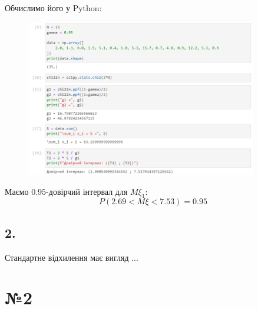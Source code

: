 \documentclass[11pt, a4paper]{article} %
\begin{document}
Обчислимо його у Python:
\begin{figure}[h]
    \centering
    \includegraphics[width=0.9\textwidth]{img/task1.png}
\end{figure}

\begin{mdframed}[style=ans]
    Маємо $0.95$-довірчий інтервал для $M\xi_1$:
    $$P\left(2.69 < M\xi < 7.53\right) = 0.95$$
\end{mdframed}

\subsection*{2.}
Стандартне відхилення має вигляд ...

\section*{№2}
\end{document}
